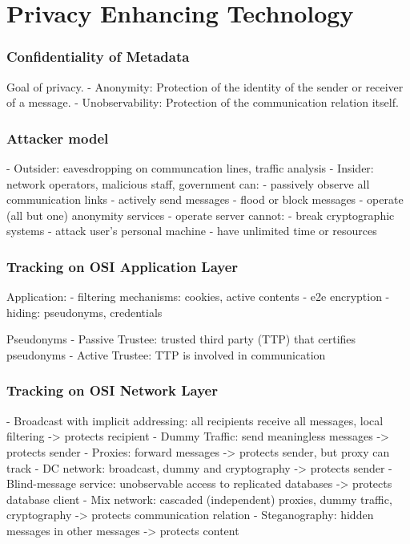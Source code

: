 \documentclass{article}
\author{Leopold Lemmermann}
\begin{document}
\createtitle

\part{Privacy Enhancing Technology}

\section{Confidentiality of Metadata}
Goal of privacy.
- Anonymity: Protection of the identity of the sender or receiver of a message.
- Unobservability: Protection of the communication relation itself.


\section{Attacker model}
- Outsider: eavesdropping on communcation lines, traffic analysis
- Insider: network operators, malicious staff, government
can:
- passively observe all communication links
- actively send messages
- flood or block messages
- operate (all but one) anonymity services
- operate server
cannot:
- break cryptographic systems
- attack user's personal machine
- have unlimited time or resources


\section{Tracking on OSI Application Layer}
Application:
- filtering mechanisms: cookies, active contents
- e2e encryption
- hiding: pseudonyms, credentials

Pseudonyms
- Passive Trustee: trusted third party (TTP) that certifies pseudonyms
- Active Trustee: TTP is involved in communication

\section{Tracking on OSI Network Layer}
- Broadcast with implicit addressing: all recipients receive all messages, local filtering -> protects recipient
- Dummy Traffic: send meaningless messages -> protects sender
- Proxies: forward messages -> protects sender, but proxy can track
- DC network: broadcast, dummy and cryptography -> protects sender
- Blind-message service: unobservable access to replicated databases -> protects database client
- Mix network: cascaded (independent) proxies, dummy traffic, cryptography -> protects communication relation
- Steganography: hidden messages in other messages -> protects content
\end{document}
